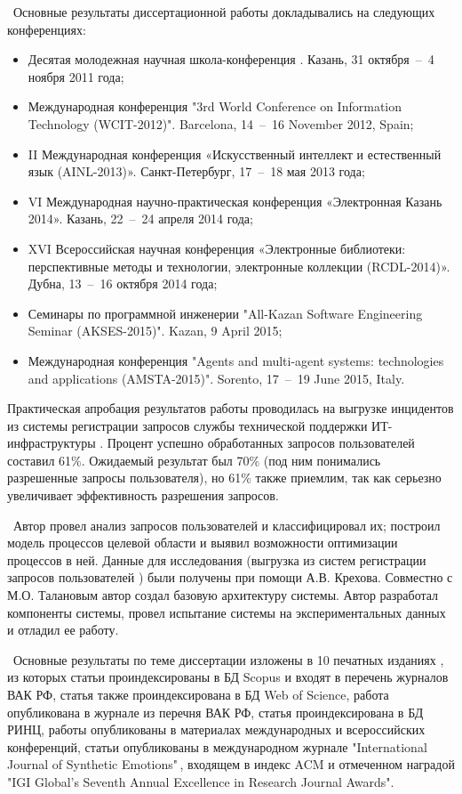 \probation\
 Основные результаты диссертационной работы докладывались на следующих конференциях:
\begin{itemize}
	\item Десятая молодежная научная школа-конференция . Казань, 31 октября~--~4 ноября 2011 года;
	\item Международная конференция "3rd World Conference on Information Technology (WCIT-2012)". Barcelona, 14~--~16 November 2012, Spain; 
	\item II Международная конференция «Искусственный интеллект и естественный язык (AINL-2013)». Санкт-Петербург, 17~--~18 мая 2013 года;
	\item VI Международная научно-практическая конференция «Электронная Казань 2014». Казань, 22~--~24 апреля 2014 года;
	\item XVI Всероссийская научная конференция «Электронные библиотеки: перспективные методы и технологии, электронные коллекции (RCDL-2014)». Дубна, 13~--~16 октября 2014 года;
	\item Семинары по программной инженерии "All-Kazan Software Engineering Seminar (AKSES-2015)". Kazan, 9 April 2015;
	\item Международная конференция "Agents and multi-agent systems: technologies and applications (AMSTA-2015)". Sorento, 17~--~19 June 2015, Italy.
\end{itemize} \par
Практическая апробация результатов работы проводилась на выгрузке инцидентов из системы регистрации запросов службы технической поддержки ИТ-инфраструктуры \icl. Процент успешно обработанных запросов пользователей составил 61\%. Ожидаемый результат был 70\% (под ним понимались разрешенные запросы пользователя), но 61\% также приемлим, так как серьезно увеличивает эффективность разрешения запросов. \par
\contribution\ Автор провел анализ запросов пользователей и классифицировал их; построил модель процессов целевой области и выявил возможности оптимизации процессов в ней. Данные для исследования (выгрузка из систем регистрации запросов пользователей \iclshort) были получены при помощи А.В. Крехова.  Совместно с М.О. Талановым автор создал базовую архитектуру системы. Автор разработал компоненты системы, провел испытание системы на экспериментальных данных и отладил ее работу. \par
\publications\ Основные результаты по теме диссертации изложены в 10 печатных изданиях  \cite{Lobachevskii, WCIT-2012,  ISGZ, IJSE-1, IJSE-2, RCDL-2014, AMSTA-2015, VAK-1, EB-1, EB-2}, из которых статьи \cite{RCDL-2014, AMSTA-2015} проиндексированы в БД Scopus и входят в перечень журналов ВАК РФ, статья \cite{AMSTA-2015} также проиндексирована в БД Web of Science, работа \cite{VAK-1} опубликована в журнале из перечня ВАК РФ, статья \cite{ISGZ} проиндексирована в БД РИНЦ, работы \cite{Lobachevskii, WCIT-2012, ISGZ} опубликованы в материалах международных и всероссийских конференций, статьи \cite{IJSE-1, IJSE-2} опубликованы в международном журнале "International Journal of Synthetic Emotions"\,, входящем в индекс ACM и отмеченном наградой "IGI Global’s Seventh Annual Excellence in Research Journal Awards". \par
